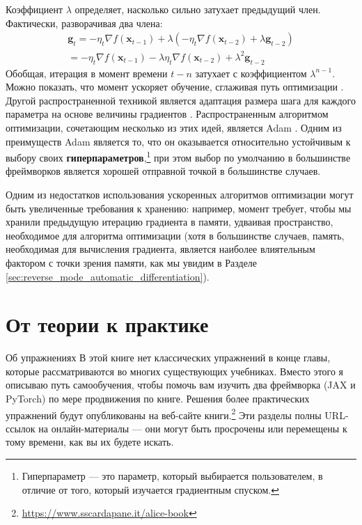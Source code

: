 Коэффициент $\lambda$ определяет, насколько сильно затухает предыдущий член. Фактически, разворачивая два члена:
%
\begin{gather*}
\mathbf{g}_t=-\eta_t\nabla f(\mathbf{x}_{t-1}) +\lambda(-\eta_t\nabla f(\mathbf{x}_{t-2}) +\lambda\mathbf{g}_{t-2}) \\ = -\eta_t\nabla f(\mathbf{x}_{t-1}) -\lambda\eta_t\nabla f(\mathbf{x}_{t-2}) +\lambda^2\mathbf{g}_{t-2}
\end{gather*}
%
Обобщая, итерация в момент времени $t-n$ затухает с коэффициентом $\lambda^{n-1}$. Можно показать, что момент ускоряет обучение, сглаживая путь оптимизации \cite{sutskever2013importance}. Другой распространенной техникой является адаптация размера шага для каждого параметра на основе величины градиентов \cite{zhang2023dive}. Распространенным алгоритмом оптимизации, сочетающим несколько из этих идей, является Adam \cite{kingma2014adam}. Одним из преимуществ Adam является то, что он оказывается относительно устойчивым к выбору своих \textbf{гиперпараметров},\footnote{Гиперпараметр — это параметр, который выбирается пользователем, в отличие от того, который изучается градиентным спуском.} при этом выбор по умолчанию в большинстве фреймворков является хорошей отправной точкой в большинстве случаев.

Одним из недостатков использования ускоренных алгоритмов оптимизации могут быть увеличенные требования к хранению: например, момент требует, чтобы мы хранили предыдущую итерацию градиента в памяти, удваивая пространство, необходимое для алгоритма оптимизации (хотя в большинстве случаев, память, необходимая для вычисления градиента, является наиболее влиятельным фактором с точки зрения памяти, как мы увидим в Разделе \ref{sec:reverse_mode_automatic_differentiation}).

\newpage
\section*{От теории к практике}

\begin{supportbox}{Об упражнениях}
В этой книге нет классических упражнений в конце главы, которые рассматриваются во многих существующих учебниках. Вместо этого я описываю путь самообучения, чтобы помочь вам изучить два фреймворка (JAX и PyTorch) по мере продвижения по книге. Решения более практических упражнений будут опубликованы на веб-сайте книги.\footnote{\url{https://www.sscardapane.it/alice-book}} Эти разделы полны URL-ссылок на онлайн-материалы — они могут быть просрочены или перемещены к тому времени, как вы их будете искать.
\end{supportbox}

